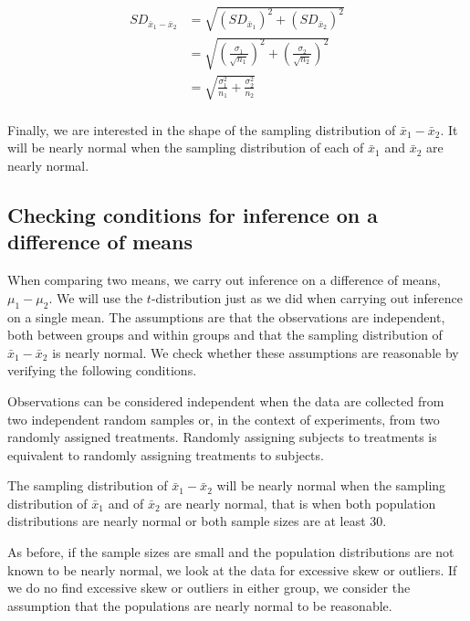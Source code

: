 \begin{align*}
SD_{\bar{x}_{1} - \bar{x}_{2}}
    &= \sqrt{\left(SD_{\bar{x}_{1}}\right)^2 +\left(SD_{\bar{x}_{2}}\right)^2 } \\
    &= \sqrt{\left(\frac{\sigma_{1}}{\sqrt{n_1}}\right)^2 + \left(\frac{\sigma_{2}}{\sqrt{n_2}}\right)^2 } \\
	&= \sqrt{\frac{\sigma_{1}^2}{n_{1}} + \frac{\sigma_{2}^2}{n_{2}}} \\
\end{align*}

Finally, we are interested in the shape of the sampling distribution of  $\bar{x}_1-\bar{x}_2$.  It will be nearly normal when the sampling distribution of each of $\bar{x}_1$ and $\bar{x}_2$ are nearly normal.

\subsection{Checking conditions for inference on a difference of means}
When comparing two means, we carry out inference on a difference of means, $\mu_1-\mu_2$.  We will use the $t$-distribution just as we did when carrying out inference on a single mean.  The assumptions are that the observations are independent, both between groups and within groups and that the sampling distribution of $\bar{x}_1-\bar{x}_2$ is nearly normal.  We check whether these assumptions are reasonable by verifying the following conditions.
\begin{description}
\setlength{\itemsep}{0mm}
\item[Independent.] Observations can be considered independent when the data are collected from two independent random samples or, in the context of experiments, from two randomly assigned treatments.  Randomly assigning subjects to treatments is equivalent to randomly assigning treatments to subjects.  
\item[Nearly normal sampling distribution.] The sampling distribution of $\bar{x}_1-\bar{x}_2$ will be nearly normal when the sampling distribution of $\bar{x}_1$ and of $\bar{x}_2$ are nearly normal, that is when both population distributions are nearly normal or both sample sizes are at least 30.  
\end{description}

As before, if the sample sizes are small and the population distributions are not known to be nearly normal, we look at the data for excessive skew or outliers.  If we do no find excessive skew or outliers in either group, we consider the assumption that the populations are nearly normal to be reasonable.



